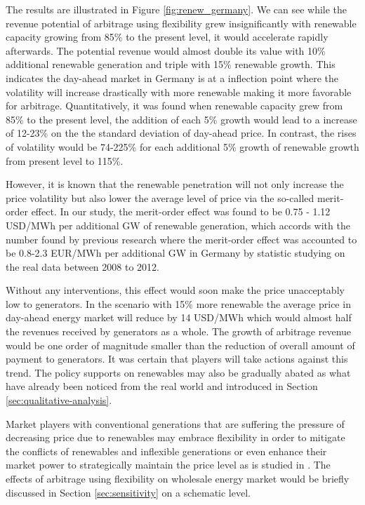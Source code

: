 The results are illustrated in Figure \ref{fig:renew_germany}. We can see while the revenue potential of arbitrage using flexibility grew insignificantly with renewable capacity growing from 85\% to the present level, it would accelerate rapidly afterwards. The potential revenue would almost double its value with 10\% additional renewable generation and triple with 15\% renewable growth. This indicates the day-ahead market in Germany is at a inflection point where the volatility will increase drastically with more renewable making it more favorable for arbitrage. Quantitatively, it was found when renewable capacity grew from 85\% to the present level, the addition of each 5\% growth would lead to a increase of 12-23\% on the
the standard deviation of day-ahead price. In contrast, the rises of volatility would be 74-225\% for each additional 5\% growth of renewable growth from present level to 115\%.

However, it is known that the renewable penetration will not only increase the price volatility but also lower the average level of price via the so-called merit-order effect. In our study, the merit-order effect was found to be 0.75 - 1.12 USD/MWh per additional GW of renewable generation, which accords with the number found by previous research where the merit-order effect was accounted to be 0.8-2.3 EUR/MWh  per additional GW in Germany by statistic studying on the real data between 2008 to 2012. 

Without any interventions, this effect would soon make the price unacceptably low to generators. In the scenario with 15\% more renewable the average price in day-ahead energy market will reduce by 14 USD/MWh which would almost half the revenues received by generators as a whole. The growth of arbitrage revenue would be one order of magnitude smaller than the reduction of overall amount of payment to generators. It was certain that players will take actions against this trend. The policy supports on renewables may also be gradually abated as what have already been noticed from the real world and introduced in Section \ref{sec:qualitative-analysis}. 

Market players with conventional generations that are suffering the pressure of decreasing price due to renewables may embrace flexibility in order to mitigate the conflicts of renewables and inflexible generations or even enhance their market power to strategically maintain the price level as is studied in \cite{Schill2011}. The effects of arbitrage using flexibility on wholesale energy market would be briefly discussed in Section \ref{sec:sensitivity} on a schematic level.

